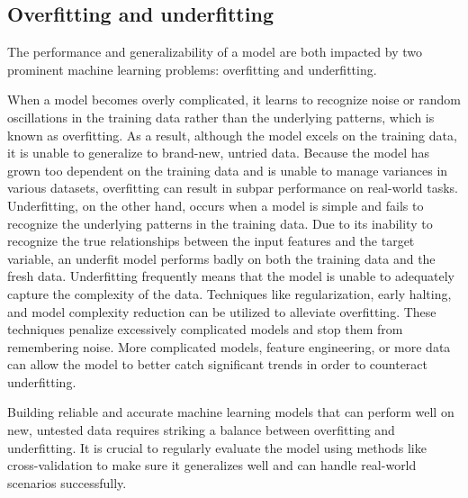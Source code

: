 \documentclass[a4paper,11pt]{report}%
\renewcommand{\\}{\vspace*{0.5\baselineskip} \newline}
\begin{document}
\subsection{Overfitting and underfitting}
The performance and generalizability of a model are both impacted by two prominent machine learning problems: overfitting and underfitting.

\noindent When a model becomes overly complicated, it learns to recognize noise or random oscillations in the training data rather than the underlying patterns, which is known as overfitting. As a result, although the model excels on the training data, it is unable to generalize to brand-new, untried data. Because the model has grown too dependent on the training data and is unable to manage variances in various datasets, overfitting can result in subpar performance on real-world tasks.
Underfitting, on the other hand, occurs when a model is simple and fails to recognize the underlying patterns in the training data. Due to its inability to recognize the true relationships between the input features and the target variable, an underfit model performs badly on both the training data and the fresh data. Underfitting frequently means that the model is unable to adequately capture the complexity of the data.
Techniques like regularization, early halting, and model complexity reduction can be utilized to alleviate overfitting. These techniques penalize excessively complicated models and stop them from remembering noise. More complicated models, feature engineering, or more data can allow the model to better catch significant trends in order to counteract underfitting.

\noindent Building reliable and accurate machine learning models that can perform well on new, untested data requires striking a balance between overfitting and underfitting. It is crucial to regularly evaluate the model using methods like cross-validation to make sure it generalizes well and can handle real-world scenarios successfully.
\end{document}
